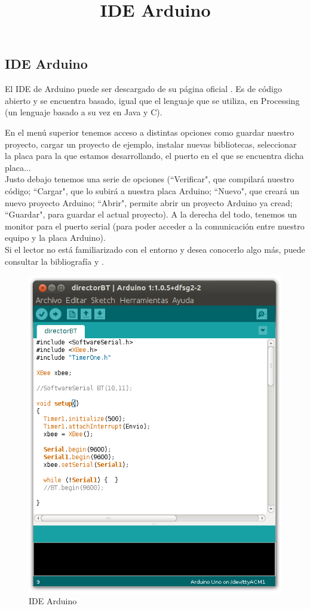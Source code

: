 \subsection{IDE Arduino}
\title{IDE Arduino}

El IDE de Arduino puede ser descargado de su página oficial \cite{arduinoWeb}. Es de código abierto y se
encuentra basado, igual que el lenguaje que se utiliza, en Processing (un lenguaje basado a su vez en Java y C).

En el menú superior tenemos acceso a distintas opciones como guardar nuestro proyecto, cargar un proyecto de ejemplo,
instalar nuevas bibliotecas, seleccionar la placa para la que estamos desarrollando, el puerto en el que se encuentra dicha
placa...\\

Justo debajo tenemos una serie de opciones (``Verificar", que compilará nuestro código; ``Cargar", que lo
subirá a nuestra placa Arduino; ``Nuevo", que creará un nuevo proyecto Arduino; ``Abrir", permite abrir un proyecto
Arduino ya cread; ``Guardar", para guardar el actual proyecto). A la derecha del todo, tenemos un monitor para el
puerto serial (para poder acceder a la comunicación entre nuestro equipo y la placa Arduino).\\

Si el lector no está familiarizado con el entorno y desea conocerlo algo más, puede consultar la bibliografía \cite{arduinoInicia} y
\cite{arduino24}.

\begin{figure}[!htb]
\centering
\includegraphics[width=1\textwidth]{./imagenes/arduinoide}
\caption{IDE Arduino} \label{fig:arduinoide}
\end{figure}

